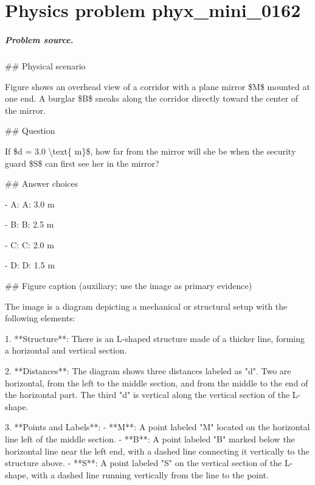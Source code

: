 
\chapter{Physics problem phyx\_mini\_0162}
\label{ch:PhyXMiniProblems_problem_phyx_mini_0162}

\paragraph{Problem source.}
\#\# Physical scenario

Figure shows an overhead view of a corridor with a plane mirror \$M\$ mounted at one end. A burglar \$B\$ sneaks along the corridor directly toward the center of the mirror.

\#\# Question

If \$d = 3.0 \textbackslash{}text\{ m\}\$, how far from the mirror will she be when the security guard \$S\$ can first see her in the mirror?

\#\# Answer choices

- A: A: 3.0 m

- B: B: 2.5 m

- C: C: 2.0 m

- D: D: 1.5 m

\#\# Figure caption (auxiliary; use the image as primary evidence)

The image is a diagram depicting a mechanical or structural setup with the following elements:

1. **Structure**: There is an L-shaped structure made of a thicker line, forming a horizontal and vertical section.

2. **Distances**: The diagram shows three distances labeled as "d". Two are horizontal, from the left to the middle section, and from the middle to the end of the horizontal part. The third "d" is vertical along the vertical section of the L-shape.

3. **Points and Labels**:
   - **M**: A point labeled "M" located on the horizontal line left of the middle section.
   - **B**: A point labeled "B" marked below the horizontal line near the left end, with a dashed line connecting it vertically to the structure above.
   - **S**: A point labeled "S" on the vertical section of the L-shape, with a dashed line running vertically from the line to the point.

